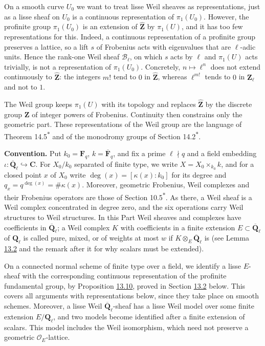 \documentclass[11pt]{article}
\newcommand{\bpout}[1]{#1\textsuperscript{\hyperlink{bp-outside}{\ensuremath{\ast}}}}
\begin{document}
On a smooth curve \(U_0\) we want to treat lisse Weil sheaves as representations, just as a lisse sheaf on \(U_0\) is a continuous representation of \(\pi_1(U_0)\). However, the profinite group \(\pi_1(U_0)\) is an extension of \(\widehat{\mathbf Z}\) by \(\pi_1(U)\), and it has too few representations for this. Indeed, a continuous representation of a profinite group preserves a lattice, so a lift \(s\) of Frobenius acts with eigenvalues that are \(\ell\)-adic units. Hence the rank-one Weil sheaf \(\mathcal B_\ell\), on which \(s\) acts by \(\ell\) and \(\pi_1(U)\) acts trivially, is not a representation of \(\pi_1(U_0)\). Concretely, \(n\mapsto\ell^n\) does not extend continuously to \(\widehat{\mathbf Z}\): the integers \(m!\) tend to \(0\) in \(\widehat{\mathbf Z}\), whereas \(\ell^{m!}\) tends to \(0\) in \(\mathbf Z_\ell\) and not to \(1\).

The Weil group keeps \(\pi_1(U)\) with its topology and replaces \(\widehat{\mathbf Z}\) by the discrete group \(\mathbf Z\) of integer powers of Frobenius. Continuity then constrains only the geometric part. These representations of the Weil group are the language of Theorem \bpout{14.5} and of the monodromy groups of Section \bpout{14.2}.

\label{bp5}%
\textbf{Convention.} Put \(k_0=\mathbf F_q\), \(k=\overline{\mathbf F}_q\), and fix a prime \(\ell\nmid q\) and a field embedding \(\iota:\overline{\mathbf Q}_\ell\hookrightarrow\mathbf C\). For \(X_0/k_0\) separated of finite type, we write \(X=X_0\times_{k_0}k\), and for a closed point \(x\) of \(X_0\) write \(\deg(x)=[\kappa(x):k_0]\) for its degree and \(q_x=q^{\deg(x)}=\#\kappa(x)\). Moreover, geometric Frobenius, Weil complexes and their Frobenius operators are those of Section \bpout{10.5}. As there, a Weil sheaf is a Weil complex concentrated in degree zero, and the six operations carry Weil structures to Weil structures. In this Part Weil sheaves and complexes have coefficients in \(\overline{\mathbf Q}_\ell\); a Weil complex \(K\) with coefficients in a finite extension \(E\subset\overline{\mathbf Q}_\ell\) of \(\mathbf Q_\ell\) is called pure, mixed, or of weights at most \(w\) if \(K\otimes_E\overline{\mathbf Q}_\ell\) is (see Lemma \hyperref[bp9]{13.2} and the remark after it for why scalars must be extended).

On a connected normal scheme of finite type over a field, we identify a lisse \(E\)-sheaf with the corresponding continuous representation of the profinite fundamental group, by Proposition \hyperref[bp32]{13.10}, proved in Section \hyperref[bp24]{13.2} below. This covers all arguments with representations below, since they take place on smooth schemes. Moreover, a lisse Weil \(\overline{\mathbf Q}_\ell\)-sheaf has a lisse Weil model over some finite extension \(E/\mathbf Q_\ell\), and two models become identified after a finite extension of scalars. This model includes the Weil isomorphism, which need not preserve a geometric \(\mathcal O_E\)-lattice.
\end{document}
